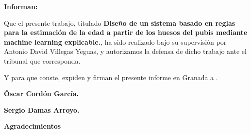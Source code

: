\vspace{1cm}

\textbf{Informan:}

\vspace{1cm}

Que el presente trabajo, titulado \textbf{Diseño de un sistema basado en reglas para la estimación de la edad a partir de los huesos del pubis mediante machine learning explicable.}, ha sido realizado bajo su supervisión por Antonio David Villegas Yeguas, y autorizamos la defensa de dicho trabajo ante el tribunal que corresponda.

\vspace{1cm}

Y para que conste, expiden y firman el presente informe en Granada a \thedate.

\vspace{5cm}

\textbf{Óscar Cordón García.}

\textbf{Sergio Damas Arroyo.}

\newpage

{\Large \textbf{Agradecimientos}}

\vspace*{2cm}
